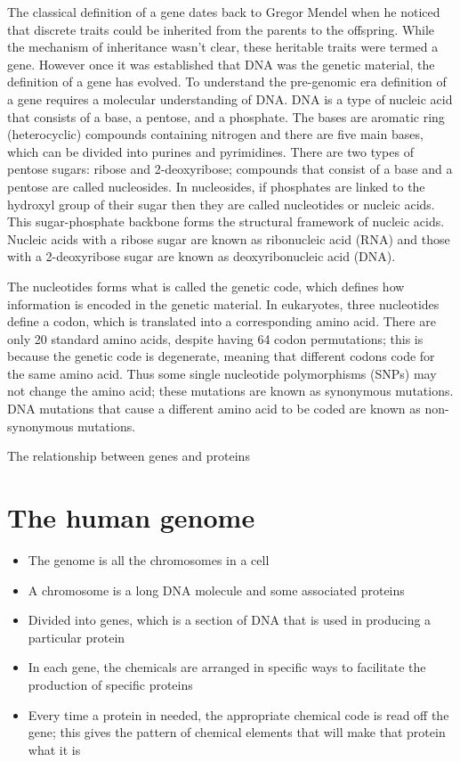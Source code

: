 The classical definition of a gene dates back to Gregor Mendel when he noticed that discrete traits could be inherited from the parents to the offspring. While the mechanism of inheritance wasn't clear, these heritable traits were termed a gene. However once it was established that DNA was the genetic material, the definition of a gene has evolved. To understand the pre-genomic era definition of a gene requires a molecular understanding of DNA. DNA is a type of nucleic acid that consists of a base, a pentose, and a phosphate. The bases are aromatic ring (heterocyclic) compounds containing nitrogen and there are five main bases, which can be divided into purines and pyrimidines. There are two types of pentose sugars: ribose and 2-deoxyribose; compounds that consist of a base and a pentose are called nucleosides. In nucleosides, if phosphates are linked to the hydroxyl group of their sugar then they are called nucleotides or nucleic acids. This sugar-phosphate backbone forms the structural framework of nucleic acids. Nucleic acids with a ribose sugar are known as ribonucleic acid (RNA) and those with a 2-deoxyribose sugar are known as deoxyribonucleic acid (DNA).

The nucleotides forms what is called the genetic code, which defines how information is encoded in the genetic material. In eukaryotes, three nucleotides define a codon, which is translated into a corresponding amino acid. There are only 20 standard amino acids, despite having 64 codon permutations; this is because the genetic code is degenerate, meaning that different codons code for the same amino acid. Thus some single nucleotide polymorphisms (SNPs) may not change the amino acid; these mutations are known as synonymous mutations. DNA mutations that cause a different amino acid to be coded are known as non-synonymous mutations.

The relationship between genes and proteins

\cite{pmid17567988}

\section{The human genome}

\begin{itemize}

   \item The genome is all the chromosomes in a cell
   \item A chromosome is a long DNA molecule and some associated proteins
   \item Divided into genes, which is a section of DNA that is used in producing a particular protein
   \item In each gene, the chemicals are arranged in specific ways to facilitate the production of specific proteins
   \item Every time a protein in needed, the appropriate chemical code is read off the gene; this gives the pattern of chemical elements that will make that protein what it is
   
\end{itemize}

